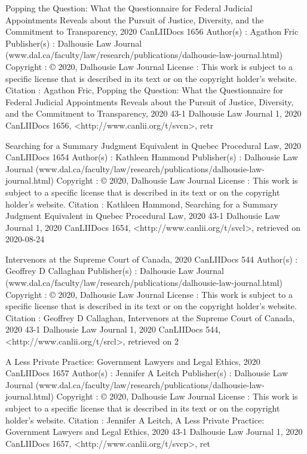 Popping the Question: What the Questionnaire for Federal Judicial Appointments Reveals about the Pursuit of Justice, Diversity, and the Commitment to Transparency, 2020 CanLIIDocs 1656
Author(s) : 	Agathon Fric
Publisher(s) : 	Dalhousie Law Journal (www.dal.ca/faculty/law/research/publications/dalhousie-law-journal.html)
Copyright : 	© 2020, Dalhousie Law Journal
License : 	This work is subject to a specific license that is described in its text or on the copyright holder's website.
Citation : 	Agathon Fric, Popping the Question: What the Questionnaire for Federal Judicial Appointments Reveals about the Pursuit of Justice, Diversity, and the Commitment to Transparency, 2020 43-1 Dalhousie Law Journal 1, 2020 CanLIIDocs 1656, <http://www.canlii.org/t/svcn>, retr



Searching for a Summary Judgment Equivalent in Quebec Procedural Law, 2020 CanLIIDocs 1654
Author(s) : 	Kathleen Hammond
Publisher(s) : 	Dalhousie Law Journal (www.dal.ca/faculty/law/research/publications/dalhousie-law-journal.html)
Copyright : 	© 2020, Dalhousie Law Journal
License : 	This work is subject to a specific license that is described in its text or on the copyright holder's website.
Citation : 	Kathleen Hammond, Searching for a Summary Judgment Equivalent in Quebec Procedural Law, 2020 43-1 Dalhousie Law Journal 1, 2020 CanLIIDocs 1654, <http://www.canlii.org/t/svcl>, retrieved on 2020-08-24




Intervenors at the Supreme Court of Canada, 2020 CanLIIDocs 544
Author(s) : 	Geoffrey D Callaghan
Publisher(s) : 	Dalhousie Law Journal (www.dal.ca/faculty/law/research/publications/dalhousie-law-journal.html)
Copyright : 	© 2020, Dalhousie Law Journal
License : 	This work is subject to a specific license that is described in its text or on the copyright holder's website.
Citation : 	Geoffrey D Callaghan, Intervenors at the Supreme Court of Canada, 2020 43-1 Dalhousie Law Journal 1, 2020 CanLIIDocs 544, <http://www.canlii.org/t/srcl>, retrieved on 2



A Less Private Practice: Government Lawyers and Legal Ethics, 2020 CanLIIDocs 1657
Author(s) : 	Jennifer A Leitch
Publisher(s) : 	Dalhousie Law Journal (www.dal.ca/faculty/law/research/publications/dalhousie-law-journal.html)
Copyright : 	© 2020, Dalhousie Law Journal
License : 	This work is subject to a specific license that is described in its text or on the copyright holder's website.
Citation : 	Jennifer A Leitch, A Less Private Practice: Government Lawyers and Legal Ethics, 2020 43-1 Dalhousie Law Journal 1, 2020 CanLIIDocs 1657, <http://www.canlii.org/t/svcp>, ret



